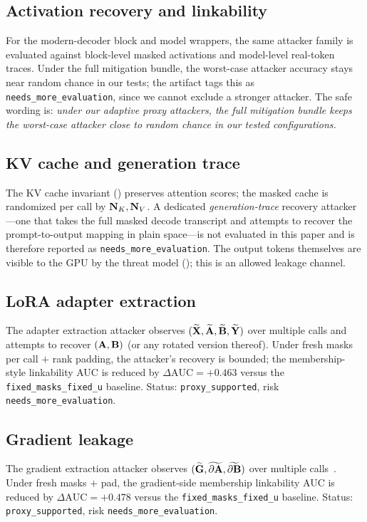 \subsection{Activation recovery and linkability}
\label{sec:security:activation}
For the modern-decoder block and model wrappers, the same attacker family is evaluated against block-level masked activations and model-level real-token traces. Under the full mitigation bundle, the worst-case attacker accuracy stays near random chance in our tests; the artifact tags this as \texttt{needs\_more\_evaluation}, since we cannot exclude a stronger attacker. The safe wording is: \emph{under our adaptive proxy attackers, the full mitigation bundle keeps the worst-case attacker close to random chance in our tested configurations.}

\subsection{KV cache and generation trace}
\label{sec:security:kv}
The KV cache invariant () preserves attention scores; the masked cache is randomized per call by $\mathbf{N}_{K}, \mathbf{N}_{V}$. A dedicated \emph{generation-trace} recovery attacker---one that takes the full masked decode transcript and attempts to recover the prompt-to-output mapping in plain space---is not evaluated in this paper and is therefore reported as \texttt{needs\_more\_evaluation}. The output tokens themselves are visible to the GPU by the threat model (); this is an allowed leakage channel.

\subsection{LoRA adapter extraction}
\label{sec:security:adapter}
The adapter extraction attacker observes $(\widetilde{\mathbf{X}}, \widetilde{\mathbf{A}}, \widetilde{\mathbf{B}}, \widetilde{\mathbf{Y}})$ over multiple calls and attempts to recover $(\mathbf{A}, \mathbf{B})$ (or any rotated version thereof). Under fresh masks per call $+$ rank padding, the attacker's recovery is bounded; the membership-style linkability AUC is reduced by $\Delta\text{AUC} = +0.463$ versus the \texttt{fixed\_masks\_fixed\_u} baseline. Status: \texttt{proxy\_supported}, risk \texttt{needs\_more\_evaluation}.

\subsection{Gradient leakage}
\label{sec:security:gradient}
The gradient extraction attacker observes $(\widetilde{\mathbf{G}}, \widetilde{\partial\mathbf{A}}, \widetilde{\partial\mathbf{B}})$ over multiple calls~\cite{zhu2019dlg, zhao2020idlg}. Under fresh masks $+$ pad, the gradient-side membership linkability AUC is reduced by $\Delta\text{AUC} = +0.478$ versus the \texttt{fixed\_masks\_fixed\_u} baseline. Status: \texttt{proxy\_supported}, risk \texttt{needs\_more\_evaluation}.

